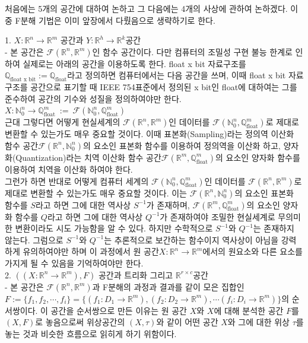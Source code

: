 \documentclass{book}
\begin{document}
\begin{landscape}
처음에는 5개의 공간에 대하여 논하고 그 다음에는 4개의 사상에 관하여 논하겠다. 이 중 F분해 기법은 이미 앞장에서 다뤘음으로 생략하기로 한다.\\\newline

1. $X:\mathbb{R}^n \rightarrow \mathbb{R}^m$ 공간과 $Y:\mathbb{R}^h\rightarrow\mathbb{R}^k$공간\\
- 본 공간은 $\mathcal{F}(\mathbb{R}^n, \mathbb{R}^m)$인 함수 공간이다. 다만 컴퓨터의 조밀성 구현 불능 한계로 인하여 실제로는 아래의 공간을 이용하도록 한다. 
float x bit 자료구조를 $\mathbb{Q}_{\text{float x bit}}:=\mathbb{Q}_{\text{float}}$라고 정의하면 컴퓨터에서는 다음 공간을 쓰며, 이때 float x bit 자료구조를 공간으로 표기할 때 IEEE 754표준에서 정의된 x bit인 float에 대하여는 그를 준수하여 공간의 기수와 성질을 정의하여야만 한다.\\
$X:\mathbb{N}_0^n \rightarrow \mathbb{Q}_{\text{float}}^m ~:=~ \mathcal{F}(\mathbb{N}_0^n , \mathbb{Q}_{\text{float}}^m)$\\\newline
근대 그렇다면 어떻게 현실세계의 $\mathcal{F}(\mathbb{R}^n, \mathbb{R}^m)$인 데이터를 $\mathcal{F}(\mathbb{N}_0^n , \mathbb{Q}_{\text{float}}^m)$로 제대로 변환할 수 있는가도 매우 중요할 것이다. 
이때 표본화(Sampling)라는 정의역 이산화 함수 공간$\mathcal{F}(\mathbb{R}^n,\mathbb{N}_0^n)$의 요소인 표본화 함수를 이용하여 정의역을 이산화 하고, 양자화(Quantization)라는 치역 이산화 함수 공간$\mathcal{F}(\mathbb{R}^m,\mathbb{Q}_{\text{float}}^m)$의 요소인 양자화 함수를 이용하여 치역을 이산화 하여야 한다.\\\newline
그런가 하면 반대로 어떻게 컴퓨터 세계의 $\mathcal{F}(\mathbb{N}_0^n , \mathbb{Q}_{\text{float}}^m)$인 데이터를 $\mathcal{F}(\mathbb{R}^n, \mathbb{R}^m)$로 제대로 변환할 수 있는가도 매우 중요할 것이다. 
이는 $\mathcal{F}(\mathbb{R}^n,\mathbb{N}_0^n)$의 요소인 표본화 함수를 $S$라고 하면 그에 대한 역사상 $S^{-1}$가 존재하며, $\mathcal{F}(\mathbb{R}^m,\mathbb{Q}_{\text{float}}^m)$의 요소인 양자화 함수를 $Q$라고 하면 그에 대한 역사상 $Q^{-1}$가 존재하여야 조밀한 현실세계로 무의미한 변환이라도 시도 가능함을 알 수 있다. 하지만 수학적으로 $S^{-1}$와  $Q^{-1}$는 존재하지 않는다. 그럼으로 $S^{-1}$와  $Q^{-1}$는 추론적으로 보간하는 함수이지 역사상이 아님을 강력하게 유의하여야만 하며 이 과정에서 원 공간$X:\mathbb{R}^n \rightarrow \mathbb{R}^m$에서의 원요소와 다른 요소를 가지게 될 수 있음을 기억하여야만 한다.\\

2. $((X:\mathbb{R}^n \rightarrow \mathbb{R}^m),F)$ 공간과 트리화 그리고 $\mathbb{R}^{r \times c}$공간\\
- 본 공간은 $\mathcal{F}(\mathbb{R}^n, \mathbb{R}^m)$과 F분해의 과정과 결과를 같이 모은 집합인 $F:=\{f_1, f_2 ,\cdots, f_i\}=\{(f_1:D_1\rightarrow \mathbb{R}^m),(f_2:D_2\rightarrow \mathbb{R}^m), \cdots (f_i:D_i\rightarrow \mathbb{R}^m)\}$의 순서쌍이다. 이 공간을 순서쌍으로 만든 이유는 원 공간 $X$와 $X$에 대해 분석한 공간 $F$를 $(X,F)$로 놓음으로써 위상공간의 $(X,\tau)$와 같이 어떤 공간 $X$와 그에 대한 위상 $\tau$를 놓는 것과 비슷한 흐름으로 읽히게 하기 위함이다.\\


\end{landscape}
\end{document}
